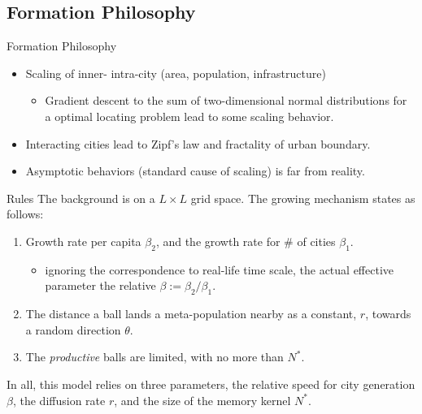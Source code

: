 \documentclass{beamer}
\begin{document}
\subsection{Formation Philosophy}
\begin{frame}{Formation Philosophy}
  \begin{itemize}
    \item Scaling of inner- intra-city (area, population, infrastructure)
    \begin{itemize}
      \item Gradient descent to the sum of two-dimensional normal distributions for a optimal locating problem lead to some scaling behavior.
    \end{itemize}
    \item Interacting cities lead to Zipf's law and fractality of urban boundary.
    \item Asymptotic behaviors (standard cause of scaling) is far from reality.
  \end{itemize}
\end{frame}

\begin{frame}{Rules}
  The background is on a $L\times L$ grid space. The growing mechanism states as follows:
  \begin{enumerate}
    \item Growth rate per capita $\beta_2$, and the growth rate for \# of cities $\beta_1$.
    \begin{itemize}
      \item ignoring the correspondence to real-life time scale, the actual effective parameter the relative $\beta:=\beta_2/\beta_1$.
    \end{itemize}
    \item The distance a ball lands a meta-population nearby as a constant, $r$, towards a random direction $\theta$.
    \item The \emph{productive} balls are limited, with no more than $N^*$.
  \end{enumerate}
  \vspace{0.5cm}
  In all, this model relies on three parameters, the relative speed for city generation $\beta$, the diffusion rate $r$, and the size of the memory kernel $N^*$.
\end{frame}
\end{document}
